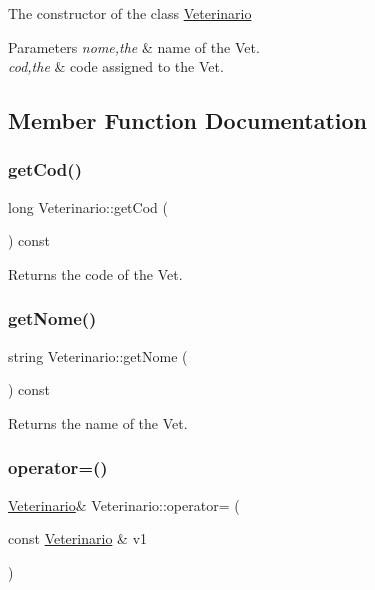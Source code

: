 The constructor of the class \mbox{\hyperlink{class_veterinario}{Veterinario}} 
\begin{DoxyParams}{Parameters}
{\em nome,the} & name of the Vet. \\
\hline
{\em cod,the} & code assigned to the Vet. \\
\hline
\end{DoxyParams}


\subsection{Member Function Documentation}
\mbox{\label{class_veterinario_a6af0a26c205f86f9a8d54abde4030658}} 
\subsubsection{\texorpdfstring{get\+Cod()}{getCod()}}
{\footnotesize\ttfamily long Veterinario\+::get\+Cod (\begin{DoxyParamCaption}{ }\end{DoxyParamCaption}) const}

Returns the code of the Vet. \mbox{\label{class_veterinario_a9002a8335b132d105919e4943c52646c}} 
\subsubsection{\texorpdfstring{get\+Nome()}{getNome()}}
{\footnotesize\ttfamily string Veterinario\+::get\+Nome (\begin{DoxyParamCaption}{ }\end{DoxyParamCaption}) const}

Returns the name of the Vet. \mbox{\label{class_veterinario_a3ff7bf618506bbfeb28971d85fadc26d}} 
\subsubsection{\texorpdfstring{operator=()}{operator=()}}
{\footnotesize\ttfamily \mbox{\hyperlink{class_veterinario}{Veterinario}}\& Veterinario\+::operator= (\begin{DoxyParamCaption}\item[{const \mbox{\hyperlink{class_veterinario}{Veterinario}} \&}]{v1 }\end{DoxyParamCaption})\hspace{0.3cm}{\ttfamily [inline]}}

